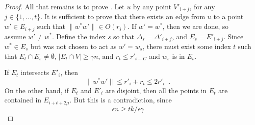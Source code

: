 \documentclass{patmorin}
\begin{document}
\begin{proof}
  All that remains is to prove .  Let $u$ by any point
  $V'_{i+j}$, for any $j\in\{1,\ldots,t\}$.  It is sufficient to prove
  that there exists an edge from $u$ to a point $w'\in E_{i+j}$ such
  that $\|w^*w'\|\in O(r_i)$.   If $w'=w^*$, then we are done, so assume
  $w'\neq w^*$.  Define the index $s$ so that $\Delta_s=\Delta'_{i+j}$,
  and $E_s=E'_{i+j}$.  Since $w^*\in E_s$ but was not chosen to act as $w'=w_s$,
  there must exist some index $t$ such that $E_t\cap E_s\neq\emptyset$,
  $|E_t\cap V|\ge\gamma n$, and $r_t \le r'_{i-C}$ and $w_s$ is in $E_t$.

  If $E_t$ intersects $E'_{i}$, then 
  \[
     \|w^*w'\|\le r'_i + r_t \le 2r'_i \enspace .
  \]
  On the other hand, if $E_t$ and $E'_{i}$ are disjoint, then all the points
  in $E_t$ are contained in $E_{i+t+2\mu}$.  But this is a contradiction,
  since
  \[
      \epsilon n \ge t k/\epsilon\gamma
  \]







\end{proof}
\end{document}
